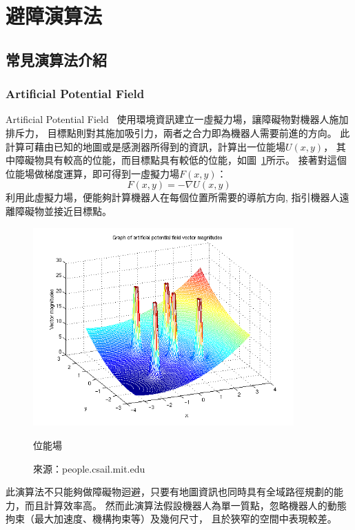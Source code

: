 \section{避障演算法}
\label{sec:vfhplus}

\subsection{常見演算法介紹}

\subsubsection{Artificial Potential Field}
Artificial Potential Field~\cite{Khatib:1985:APF}
使用環境資訊建立一虛擬力場，讓障礙物對機器人施加排斥力，
目標點則對其施加吸引力，兩者之合力即為機器人需要前進的方向。
此計算可藉由已知的地圖或是感測器所得到的資訊，計算出一位能場$U(x,y)$，
其中障礙物具有較高的位能，而目標點具有較低的位能，如圖~\ref{f:potential_field}所示。
接著對這個位能場做梯度運算，即可得到一虛擬力場$F(x,y)$：
\begin{equation}
	F(x,y) = -\nabla U(x,y)
\end{equation}
利用此虛擬力場，便能夠計算機器人在每個位置所需要的導航方向, 
指引機器人遠離障礙物並接近目標點。
\begin{figure}[h!]
	\centering
	\includegraphics[width=10cm]{figures/algorithm/demo_apf_whitebg}
	\caption{位能場}
	\caption*{來源：people.csail.mit.edu}
	\label{f:potential_field}
\end{figure}

此演算法不只能夠做障礙物迴避，只要有地圖資訊也同時具有全域路徑規劃的能力，而且計算效率高。
然而此演算法假設機器人為單一質點，忽略機器人的動態拘束（最大加速度、機構拘束等）及幾何尺寸，
且於狹窄的空間中表現較差。

